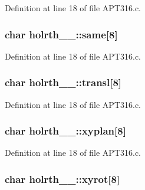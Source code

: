 Definition at line 18 of file A\+P\+T316.\+c.

\subsubsection[{\texorpdfstring{same}{same}}]{\setlength{\rightskip}{0pt plus 5cm}char holrth\+\_\+\_\+\+::same\mbox{[}8\mbox{]}}\hypertarget{structholrth__1___a98042573408a9319f728682dde2a8688}{}\label{structholrth__1___a98042573408a9319f728682dde2a8688}


Definition at line 18 of file A\+P\+T316.\+c.

\subsubsection[{\texorpdfstring{transl}{transl}}]{\setlength{\rightskip}{0pt plus 5cm}char holrth\+\_\+\_\+\+::transl\mbox{[}8\mbox{]}}\hypertarget{structholrth__1___afc1ca9e1bca3d750954f492d426472a5}{}\label{structholrth__1___afc1ca9e1bca3d750954f492d426472a5}


Definition at line 18 of file A\+P\+T316.\+c.

\subsubsection[{\texorpdfstring{xyplan}{xyplan}}]{\setlength{\rightskip}{0pt plus 5cm}char holrth\+\_\+\_\+\+::xyplan\mbox{[}8\mbox{]}}\hypertarget{structholrth__1___a73b0d426f18d0989aa84d7fdab552841}{}\label{structholrth__1___a73b0d426f18d0989aa84d7fdab552841}


Definition at line 18 of file A\+P\+T316.\+c.

\subsubsection[{\texorpdfstring{xyrot}{xyrot}}]{\setlength{\rightskip}{0pt plus 5cm}char holrth\+\_\+\_\+\+::xyrot\mbox{[}8\mbox{]}}\hypertarget{structholrth__1___a16f9b674e9d40afc84f699500bfd0992}{}\label{structholrth__1___a16f9b674e9d40afc84f699500bfd0992}


